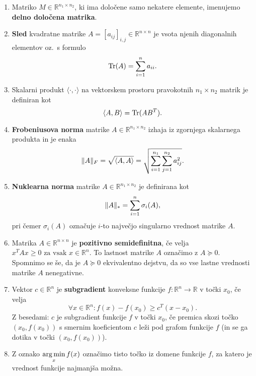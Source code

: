 \begin{enumerate}
  \item Matriko $M \in \mathbb{R}^{n_1 \times n_2}$, ki ima določene samo nekatere elemente, imenujemo \textbf{delno določena matrika}.
  \item \textbf{Sled} kvadratne  matrike $A=[a_{ij}]_{i,j}\in \mathbb R^{n\times n}$ je vsota njenih diagonalnih elementov
        oz.\ s formulo
        \[
          \operatorname{Tr}(A) = \sum_{i = 1}^{n} a_{ii}.
        \]
  \item Skalarni produkt
        $\langle\cdot,\cdot\rangle$ na vektorskem prostoru pravokotnih $n_1\times n_2$ matrik je definiran kot \[
          \langle A, B \rangle = \operatorname{Tr}(AB^T).
        \]
  \item \textbf{Frobeniusova norma} matrike $A \in \mathbb{R}^{n_1 \times n_2}$ izhaja iz zgornjega skalarnega produkta in je enaka \[
          \lVert A\rVert_F =
          \sqrt{\langle A, A \rangle}=
          \sqrt{\sum_{i = 1}^{n_1} \sum_{j = 1}^{n_2} a_{ij}^2}.
        \]
  \item \textbf{Nuklearna norma} matrike $A\in \mathbb R^{n_1\times n_2}$ je definirana kot \[
          \lVert A\rVert_* = \sum_{i = 1}^{n} \sigma_i(A),
        \] pri čemer $\sigma_i(A)$ označuje $i$-to največjo singularno vrednost matrike $A$.
  \item Matrika $A \in \mathbb{R}^{n \times n}$ je \textbf{pozitivno semidefinitna}, če velja $x^TAx \ge 0 \text{ za vsak } x \in \mathbb{R}^n$. To lastnost matrike $A$ označimo z $A \succeq 0$.
        Spomnimo se še, da je $A \succeq 0$ ekvivalentno dejstvu, da so vse  lastne vrednosti matrike $A$ nenegativne.
  \item Vektor $c\in \mathbb R^n$ je \textbf{subgradient} konveksne funkcije $f: \mathbb{R}^n \rightarrow \mathbb{R}$ v točki $x_0$, če velja
        \[
          \forall x\in\mathbb R^n: f(x) - f(x_0) \geq c^T(x - x_0).
        \]
        Z besedami: $c$ je subgradient funkcije $f$ v točki $x_0$, če premica skozi točko $(x_0,f(x_0))$ s smernim koeficientom $c$ leži pod grafom funkcije $f$ (in se ga dotika v točki $(x_0,f(x_0))$).
  \item Z oznako
        $\displaystyle\operatorname*{arg\,min}_x f(x)$
        označimo tisto točko iz domene funkcije $f$, za katero je vrednost funkcije najmanjša možna.
\end{enumerate}







